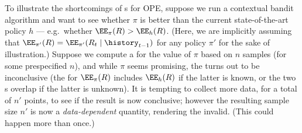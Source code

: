
To illustrate the shortcomings of \ci{}s for OPE, suppose we run a contextual bandit algorithm and want to see whether $\pi$ is better than the current state-of-the-art policy $h$ --- e.g.~whether $\EE_{\pi}(R) > \EE_{h}(R)$. (Here, we are implicitly assuming that $\EE_{\pi'}(R) = \EE_{\pi'}(R_t \mid \history_{t-1})$ for any policy $\pi'$ for the sake of illustration.) Suppose we compute a \ci{} for the value of $\pi$ based on $n$ samples (for some prespecified $n$), and while $\pi$ seems promising, the \ci{} turns out to be inconclusive (the \ci{} for $\EE_{\pi}(R)$ includes $\EE_{h}(R)$ if the latter is known, or the two \ci{}s overlap if the latter is unknown). It is tempting to  collect more data, for a total of $n'$ points, to see if the result is now conclusive; however the resulting sample size $n'$ is now a \emph{data-dependent} quantity, rendering the \ci{} invalid. (This could happen more than once.)

